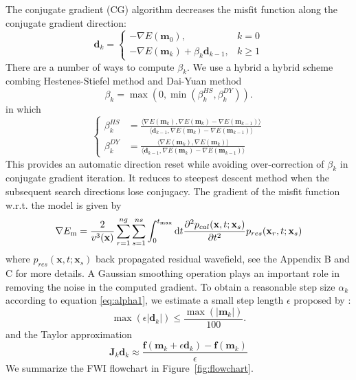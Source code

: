 The conjugate gradient (CG) algorithm decreases the misfit function along the conjugate gradient direction:
\begin{equation}
	\textbf{d}_k=
	\begin{cases}
	-\nabla E(\textbf{m}_0), & k=0\\
	-\nabla E(\textbf{m}_k)+\beta_k \textbf{d}_{k-1}, & k\geq 1
	\end{cases}
\end{equation}
There are a number of ways to compute $\beta_k$. We use a hybrid a hybrid scheme combing Hestenes-Stiefel method and Dai-Yuan method  \citep{hager2006survey}
\begin{equation}
\beta_k=\max(0, \min(\beta_k^{HS},\beta_k^{DY})).
\end{equation}
in which
\begin{equation}\label{eq:beta}
\left\{
\begin{split}
\beta_k^{HS}&=\frac{\langle\nabla E(\textbf{m}_k),\nabla E(\textbf{m}_k)-\nabla E(\textbf{m}_{k-1})\rangle}{\langle\textbf{d}_{k-1},\nabla E(\textbf{m}_k)-\nabla E(\textbf{m}_{k-1})\rangle}\\
\beta_k^{DY}&=\frac{\langle\nabla E(\textbf{m}_k),\nabla E(\textbf{m}_k)\rangle}{\langle\textbf{d}_{k-1},\nabla E(\textbf{m}_k)-\nabla E(\textbf{m}_{k-1})\rangle}
\end{split}
\right.
\end{equation}
This provides an automatic direction reset while avoiding over-correction of $\beta_k$ in conjugate gradient iteration. It reduces to steepest descent method when the subsequent search directions lose conjugacy. The gradient of the misfit function w.r.t. the model is given by \citep{bunks1995multiscale}
\begin{equation}
\nabla E_{\mathrm{m}}
=\frac{2}{v^3(\textbf{x})}\sum_{r=1}^{ng}\sum_{s=1}^{ns}\int_{0}^{t_{\max}}\mathrm{d}t 
\frac{\partial^2 p_{cal}(\textbf{x},t;\textbf{x}_s)}{\partial t^2}p_{res}(\textbf{x}_r,t;\textbf{x}_s)\\
\end{equation}
where $p_{res}(\textbf{x},t;\textbf{x}_s)$ back propagated residual wavefield, see the Appendix B and C for more details. A Gaussian smoothing operation plays an important role in removing the noise in the computed gradient. To obtain a reasonable step size $\alpha_k$ according to equation \eqref{eq:alpha1}, we estimate a small step length $\epsilon$ proposed by \cite{pica1990nonlinear}:
\begin{equation}
\max(\epsilon |\textbf{d}_k|)\leqslant \frac{\max(|\textbf{m}_k|)}{100}.
\end{equation}
and the Taylor approximation
\begin{equation}
\textbf{J}_k\textbf{d}_k\approx\frac{\textbf{f}(\textbf{m}_k+\epsilon \textbf{d}_k)-\textbf{f}(\textbf{m}_k)}{\epsilon}
\end{equation}
We summarize the FWI flowchart in Figure~\ref{fig:flowchart}.


